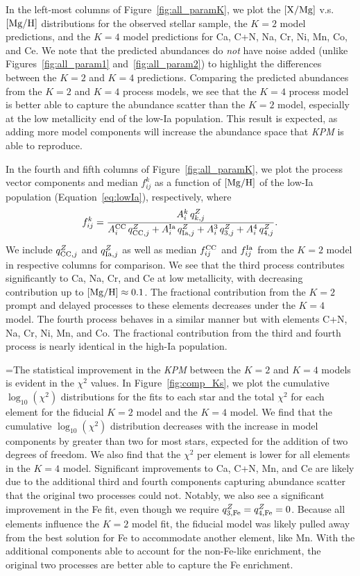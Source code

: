 \documentclass[modern, linenumbers]{aastex631}
\newcommand{\xmg}{[{\rm X}/{\rm Mg}]}
\newcommand{\mgh}{[{\rm Mg}/{\rm H}]}
\newcommand{\qcc}{q_{{\rm CC,}j}^{Z}}
\newcommand{\qIa}{q_{{\rm Ia,}j}^{Z}}
\newcommand{\Acc}{A^{\rm CC}_{i}}
\newcommand{\AIa}{A^{\rm Ia}_{i}}
\newcommand{\fcc}{f_{ij}^{\rm CC}}
\newcommand{\name}{\textsl{KPM}}
\begin{document}
In the left-most columns of Figure~\ref{fig:all_paramK}, we plot the $\xmg$ v.s. $\mgh$ distributions for the observed stellar sample, the $K=2$ model predictions, and the $K=4$ model predictions for Ca, C+N, Na, Cr, Ni, Mn, Co, and Ce. We note that the predicted abundances do \textit{not} have noise added (unlike Figures~\ref{fig:all_param1} and~\ref{fig:all_param2}) to highlight the differences between the $K=2$ and $K=4$ predictions. Comparing the predicted abundances from the $K=2$ and $K=4$ process models, we see that the $K=4$ process model is better able to capture the abundance scatter than the $K=2$ model, especially at the low metallicity end of the low-Ia population. This result is expected, as adding more model components will increase the abundance space that \name{} is able to reproduce.

In the fourth and fifth columns of Figure~\ref{fig:all_paramK}, we plot the process vector components and median $f^{k}_{ij}$ as a function of $\mgh$ of the low-Ia population (Equation~\ref{eq:lowIa}), respectively, where
\begin{equation}\label{eq:fX}
    f^{k}_{ij} = \frac{A_{i}^{k} \, q_{k,j}^Z}{\Acc\,\qcc + \AIa\,\qIa + A_{i}^{3}\,q_{3, j}^{Z} + A_{i}^{4}\,q_{4, j}^{Z}}.
\end{equation}
We include $\qcc$ and $\qIa$ as well as median $\fcc$ and $f^{\rm Ia}_{ij}$ from the $K=2$ model in respective columns for comparison. We see that the third process contributes significantly to Ca, Na, Cr, and Ce at low metallicity, with decreasing contribution up to $\mgh\approx0.1$. The fractional contribution from the $K=2$ prompt and delayed processes to these elements decreases under the $K=4$ model. The fourth process behaves in a similar manner but with elements C+N, Na, Cr, Ni, Mn, and Co. The fractional contribution from the third and fourth process is nearly identical in the high-Ia population.

=The statistical improvement in the \name{} between the $K=2$ and $K=4$ models is evident in the $\chi^2$ values.
In Figure~\ref{fig:comp_Ks}, we plot the cumulative $\log_{10}(\chi^2)$ distributions for the fits to each star and the total $\chi^2$ for each element for the fiducial $K=2$ model and the $K=4$ model. 
We find that the cumulative $\log_{10}(\chi^2)$ distribution decreases with the increase in model components by greater than two for most stars, expected for the addition of two degrees of freedom. 
We also find that the $\chi^2$ per element is lower for all elements in the $K=4$ model. 
Significant improvements to Ca, C+N, Mn, and Ce are likely due to the additional third and fourth components capturing abundance scatter that the original two processes could not. 
Notably, we also see a significant improvement in the Fe fit, even though we require $q_{\rm 3,Fe}^{Z} = q_{\rm 4,Fe}^{Z} = 0$. Because all elements influence the $K=2$ model fit, the fiducial model was likely pulled away from the best solution for Fe to accommodate another element, like Mn. 
With the additional components able to account for the non-Fe-like enrichment, the original two processes are better able to capture the Fe enrichment.
\end{document}
